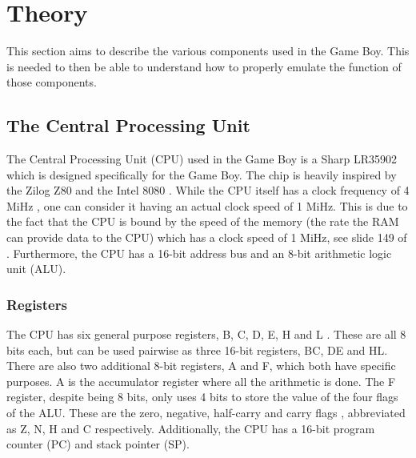 \chapter{Theory}
\label{chap:Theory}

This section aims to describe the various components used in the Game Boy. This is needed to then be able to understand how to properly emulate the function of those components.

\section{The Central Processing Unit}
The Central Processing Unit (CPU) used in the Game Boy is a Sharp LR35902 \cite{pandoscspecifications} \cite{gameboyhistory} which is designed specifically for the Game Boy. The chip is heavily inspired by the Zilog Z80 \cite{Z80} and the Intel 8080 \cite{Intel8080}. While the CPU itself has a clock frequency of 4 MiHz \cite{pandoscspecifications}, one can consider it having an actual clock speed of 1 MiHz. 
This is due to the fact that the CPU is bound by the speed of the memory \cite{GBTClockSpeed} (the rate the RAM can provide data to the CPU) which has a clock speed of 1 MiHz, see slide 149 of  \cite{ultimateGBtalkSlides}. 
Furthermore, the CPU has a 16-bit address bus \cite{pandocsmemorymap} and an 8-bit arithmetic logic unit (ALU).
\subsection{Registers}
The CPU has six general purpose registers, B, C, D, E, H and L \cite{pandocsregistersandflags}. These are all 8 bits each, but can be used pairwise as three 16-bit registers, BC, DE and HL. There are also two additional 8-bit registers, A and F, which both have specific purposes. A is the accumulator register where all the arithmetic is done. The F register, despite being 8 bits, only uses 4 bits to store the value of the four flags of the ALU. These are the zero, negative, half-carry and carry flags \cite{pandocsregistersandflags}, abbreviated as Z, N, H and C respectively. Additionally, the CPU has a 16-bit program counter (PC) and stack pointer (SP).

